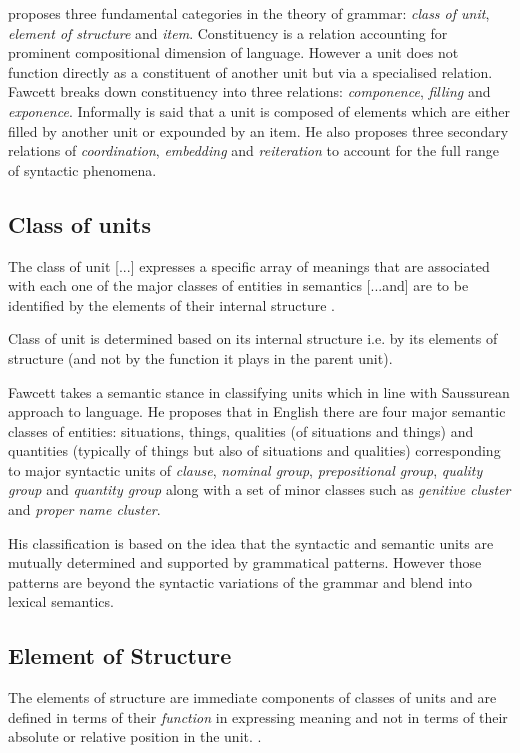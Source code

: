 \citet{Fawcett2000} proposes three fundamental categories in the theory of grammar: \textit{class of unit}, \textit{element of structure} and \textit{item}. Constituency is a relation accounting for prominent compositional dimension of language. However a unit does not function directly as a constituent of another unit but via a specialised relation. Fawcett breaks down constituency into three relations: \textit{componence}, \textit{filling} and \textit{exponence}. Informally is said that a unit is composed of elements which are either filled by another unit or expounded by an item. He also proposes three secondary relations of \textit{coordination}, \textit{embedding} and \textit{reiteration} to account for the full range of syntactic phenomena.

\subsection{Class of units}
\begin{definition}\label{def:class2}
	The class of unit [...] expresses a specific array of meanings that are associated with each one of the major classes of entities in semantics [...and] are to be identified by the elements of their internal structure \citep[p.195]{Fawcett2000}. 
\end{definition}

Class of unit is determined based on its internal structure i.e. by its elements of structure (and not by the function it plays in the parent unit).

Fawcett takes a semantic stance in classifying units which in line with Saussurean approach to language. He proposes that in English there are four major semantic classes of entities: situations, things, qualities (of situations and things) and quantities (typically of things but also of situations and qualities) corresponding to major syntactic units of \textit{clause}, \textit{nominal group}, \textit{prepositional group}, \textit{quality group} and \textit{quantity group} \citep[p.~193--194]{Fawcett2000} along with a set of minor classes such as \textit{genitive cluster } and \textit{proper name cluster}. 

His classification is based on the idea that the syntactic and semantic units are mutually determined and supported by grammatical patterns. However those patterns are beyond the syntactic variations of the grammar and blend into lexical semantics.

\subsection{Element of Structure}
\label{sec:elements-of-structure}
\begin{definition}\label{def:elementStructure}
	The elements of structure are immediate components of classes of units and are defined in terms of their \textit{function} in expressing meaning and not in terms of their absolute or relative position in the unit. \citep[pp.213--214]{Fawcett2000}. 
\end{definition}

